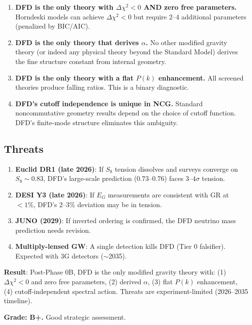 \documentclass[11pt,a4paper]{article}
\begin{document}
\begin{enumerate}
\item \textbf{DFD is the only theory with $\Delta\chi^2 < 0$ AND zero free parameters.} Horndeski models can achieve $\Delta\chi^2 < 0$ but require 2--4 additional parameters (penalized by BIC/AIC).

\item \textbf{DFD is the only theory that derives $\alpha$.} No other modified gravity theory (or indeed any physical theory beyond the Standard Model) derives the fine structure constant from internal geometry.

\item \textbf{DFD is the only theory with a flat $P(k)$ enhancement.} All screened theories produce falling ratios. This is a binary diagnostic.

\item \textbf{DFD's cutoff independence is unique in NCG.} Standard noncommutative geometry results depend on the choice of cutoff function. DFD's finite-mode structure eliminates this ambiguity.
\end{enumerate}

\subsection{Threats}

\begin{enumerate}
\item \textbf{Euclid DR1 (late 2026)}: If $S_8$ tension dissolves and surveys converge on $S_8 \sim 0.83$, DFD's large-scale prediction ($0.73$--$0.76$) faces $3$--$4\sigma$ tension.

\item \textbf{DESI Y3 (late 2026)}: If $E_G$ measurements are consistent with GR at $< 1\%$, DFD's $2$--$3\%$ deviation may be in tension.

\item \textbf{JUNO (2029)}: If inverted ordering is confirmed, the DFD neutrino mass prediction needs revision.

\item \textbf{Multiply-lensed GW}: A single detection kills DFD (Tier 0 falsifier). Expected with 3G detectors ($\sim$2035).
\end{enumerate}

\begin{tcolorbox}[colback=green!5!white, colframe=green!60!black, title={Agent 17: DFD Uniquely Positioned}]
\textbf{Result}: Post-Phase 0B, DFD is the only modified gravity theory with: (1) $\Delta\chi^2 < 0$ and zero free parameters, (2) derived $\alpha$, (3) flat $P(k)$ enhancement, (4) cutoff-independent spectral action. Threats are experiment-limited (2026--2035 timeline).

\textbf{Grade: B+.} Good strategic assessment.
\end{tcolorbox}
\end{document}
